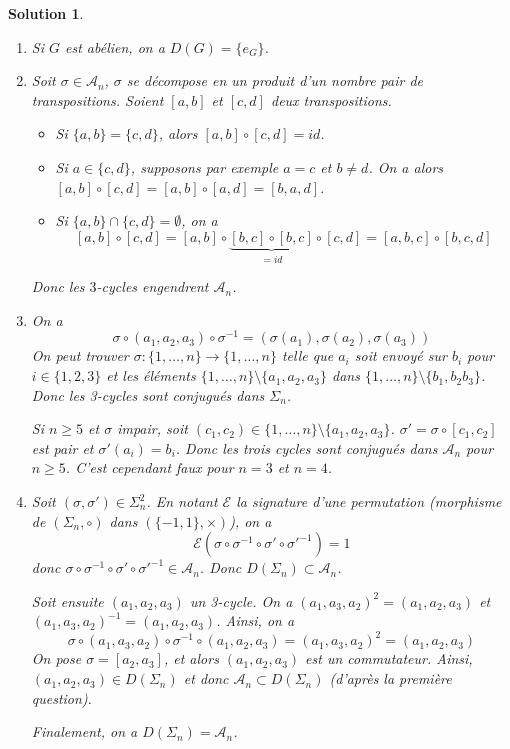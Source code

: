 \documentclass[12pt]{article}
\newtheorem{solution}{Solution}[section]
\theoremstyle{remark}
\numberwithin{equation}{section}
\begin{document}
\begin{solution}
	\phantom{}
	\begin{enumerate}
		\item Si $G$ est abélien, on a $D(G)=\{e_{G}\}$.
		\item Soit $\sigma\in\mathcal{A}_{n}$, $\sigma$ se décompose en un produit d'un nombre pair de transpositions. Soient $[a,b]$ et $[c,d]$ deux transpositions.
		\begin{itemize}
			\item Si $\{a,b\}=\{c,d\}$, alors $[a,b]\circ[c,d]=id$.
			\item Si $a\in\{c,d\}$, supposons par exemple $a=c$ et $b\neq d$. On a alors $[a,b]\circ[c,d]=[a,b]\circ[a,d]=[b,a,d]$.
			\item Si $\{a,b\}\cap\{c,d\}=\emptyset$, on a 
			$$[a,b]\circ[c,d]=[a,b]\circ\underbrace{[b,c]\circ[b,c]}_{=id}\circ[c,d]=[a,b,c]\circ[b,c,d]$$
		\end{itemize}
		Donc les $3$-cycles engendrent $\mathcal{A}_{n}$.

		\item On a 
		$$\sigma\circ(a_{1},a_{2},a_{3})\circ\sigma^{-1}=(\sigma(a_{1}),\sigma(a_{2}),\sigma(a_{3}))$$
		On peut trouver $\sigma\colon\{1,\dots,n\}\to\{1,\dots,n\}$ telle que $a_{i}$ soit envoyé sur $b_{i}$ pour $i\in\{1,2,3\}$ et les éléments $\{1,\dots,n\}\setminus\{a_{1},a_{2},a_{3}\}$ dans $\{1,\dots,n\}\setminus\{b_{1},b_{2}b_{3}\}$.
		Donc les 3-cycles sont conjugués dans $\Sigma_{n}$.

		Si $n\geqslant5$ et $\sigma$ impair, soit $(c_{1},c_{2})\in\{1,\dots,n\}\setminus\{a_{1},a_{2},a_{3}\}$. $\sigma'=\sigma\circ[c_{1},c_{2}]$ est pair et $\sigma'(a_{i})=b_{i}$. Donc les trois cycles sont conjugués dans $\mathcal{A}_{n}$ pour $n\geqslant5$. C'est cependant faux pour $n=3$ et $n=4$.

		\item Soit $(\sigma,\sigma')\in\Sigma_{n}^{2}$. En notant $\mathcal{E}$ la signature d'une permutation (morphisme de $(\Sigma_{n},\circ)$ dans $(\{-1,1\},\times)$), on a
		$$\mathcal{E}(\sigma\circ\sigma^{-1}\circ\sigma'\circ\sigma'^{-1})=1$$
		donc $\sigma\circ\sigma^{-1}\circ\sigma'\circ\sigma'^{-1}\in\mathcal{A}_{n}$. Donc $D(\Sigma_{n})\subset\mathcal{A}_{n}$.

		Soit ensuite $(a_{1},a_{2},a_{3})$ un 3-cycle. On a $(a_{1},a_{3},a_{2})^{2}=(a_{1},a_{2},a_{3})$ et $(a_{1},a_{3},a_{2})^{-1}=(a_{1},a_{2},a_{3})$. Ainsi, on a 
		$$\sigma\circ(a_{1},a_{3},a_{2})\circ\sigma^{-1}\circ(a_{1},a_{2},a_{3})=(a_{1},a_{3},a_{2})^{2}=(a_{1},a_{2},a_{3})$$
		On pose $\sigma=[a_{2},a_{3}]$, et alors $(a_{1},a_{2},a_{3})$ est un commutateur. Ainsi, $(a_{1},a_{2},a_{3})\in D(\Sigma_{n})$ et donc $\mathcal{A}_{n}\subset D(\Sigma_{n})$ (d'après la première question).

		Finalement, on a $D(\Sigma_{n})=\mathcal{A}_{n}$.
	\end{enumerate}
\end{solution}
\end{document}
